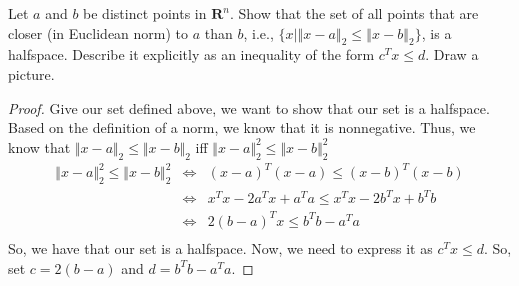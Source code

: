 \begin{prob}[1.3]
  Let $a$ and $b$ be distinct points in $\mathbf{R}^{n}$. Show that the set of
  all points that are closer (in Euclidean norm) to $a$ than $b$, i.e.,
  $\{x \vert \left \Vert x - a\right \Vert_{2} \leq \left \Vert x - b \right \Vert_{2}\}$, is a halfspace. Describe it explicitly as an inequality of the form $c^{T}x \leq d$. Draw a picture.
\end{prob}
\begin{proof}
  Give our set defined above, we want to show that our set is a halfspace.
  Based on the definition of a norm, we know that it is nonnegative.  Thus, we know that
  $\Vert x - a \Vert_{2} \leq \Vert x - b \Vert_{2}$ iff
  $\Vert x - a \Vert^{2}_{2} \leq \Vert x - b \Vert^{2}_{2}$
  \begin{eqnarray*}
    \Vert x - a \Vert^{2}_{2} \leq \Vert x - b \Vert^{2}_{2} & \Leftrightarrow & (x - a)^{T}(x-a) \leq (x-b)^{T} (x-b)\\
    & \Leftrightarrow & x^{T}x -2a^{T}x + a^{T}a \leq x^{T}x -2b^{T}x + b^{T}b\\
    & \Leftrightarrow & 2(b - a)^{T}x \leq b^{T}b - a^{T}a\\
  \end{eqnarray*}
  So, we have that our set is a halfspace. Now, we need to express it as
  $c^{T} x \leq d$. So, set $c = 2(b-a)$ and $d = b^{T}b - a^{T}a$.
  
\end{proof}
